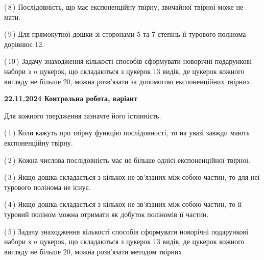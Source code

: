 \documentclass[12pt, ukrainian]{article}
\begin{document}
\begin {large}
\begin {large}
\begin {large}
\begin {large}
\begin {large}
\begin {large}
\begin {large}
\begin {large}
\begin {large}
\begin {large}
\begin {large}
\begin {large}
\begin {large}
\begin {large}
\begin {large}
\begin {large}
\begin {large}
\begin {large}
\begin {large}
\begin {large}
\begin {large}
\begin {large}
\begin {large}
\begin {large}
\begin {large}
\begin {large}
\begin {large}
\begin {large}
\begin {large}
\begin {large}
\begin {large}
\begin {large}
\begin {large}
\begin {large}
\begin {large}
\begin {large}
\begin {large}
\begin {large}
{(\,8\,) Послідовність, що має експоненційну твірну, звичайної твірної може не мати.%



(\,9\,) Для прямокутної дошки зі сторонами 5 та 7 степінь її турового полінома дорівнює 12.%



(\,10\,) Задачу знаходження кількості способів сформувати новорічні подарункові набори з $n$ цукерок, що складаються з цукерок 13 видів, де цукерок кожного вигляду не більше 20, можна розв’язати за допомогою експоненційних твірних.%




\vspace{5mm}
}
\newpage

\begin {large}

\textbf{22.11.2024 Контрольна робота, варіант  }\par


{
Для кожного твердження зазначте його істинність.\par

\vspace{2mm}

(\,1\,) Коли кажуть про твірну функцію послідовності, то на увазі завжди мають експоненційну твірну.%



(\,2\,) Кожна числова послідовність має не більше однієї  експоненційної твірної.%



(\,3\,) Якщо дошка складається з кількох не зв’язаних між собою частин, то для неї турового полінома не існує.%



(\,4\,) Якщо дошка складається з кількох не зв’язаних між собою частин, то її туровий поліном можна отримати як добуток поліномів її частин.%



(\,5\,) Задачу знаходження кількості способів сформувати новорічні подарункові набори з $n$ цукерок, що складаються з цукерок 13 видів, де цукерок кожного вигляду не більше 20, можна розв’язати методом твірних.%



}
\end{large}
\end{large}
\end{large}
\end{large}
\end{large}
\end{large}
\end{large}
\end{large}
\end{large}
\end{large}
\end{large}
\end{large}
\end{large}
\end{large}
\end{large}
\end{large}
\end{large}
\end{large}
\end{large}
\end{large}
\end{large}
\end{large}
\end{large}
\end{large}
\end{large}
\end{large}
\end{large}
\end{large}
\end{large}
\end{large}
\end{large}
\end{large}
\end{large}
\end{large}
\end{large}
\end{large}
\end{large}
\end{large}
\end{large}
\end{document}
